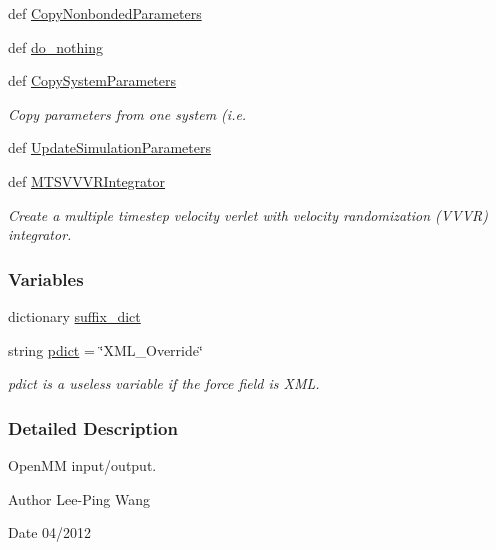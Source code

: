 \begin{DoxyCompactItemize}
\item 
def \hyperlink{namespaceforcebalance_1_1openmmio_afead47464a644d9225f9fa8eb568a8ed}{Copy\-Nonbonded\-Parameters}
\item 
def \hyperlink{namespaceforcebalance_1_1openmmio_a2bb7add6b813d94f2655372c51fe8fdc}{do\-\_\-nothing}
\item 
def \hyperlink{namespaceforcebalance_1_1openmmio_a8c6ed589ec2b35b8363a529ffdf88eb0}{Copy\-System\-Parameters}
\begin{DoxyCompactList}\small\item\em Copy parameters from one system (i.\-e. \end{DoxyCompactList}\item 
def \hyperlink{namespaceforcebalance_1_1openmmio_a9f9fc56475dbfcc94a40fef6a84ed25f}{Update\-Simulation\-Parameters}
\item 
def \hyperlink{namespaceforcebalance_1_1openmmio_aa085594c11e9cd00ce71f5a8ead72b68}{M\-T\-S\-V\-V\-V\-R\-Integrator}
\begin{DoxyCompactList}\small\item\em Create a multiple timestep velocity verlet with velocity randomization (V\-V\-V\-R) integrator. \end{DoxyCompactList}\end{DoxyCompactItemize}
\subsubsection*{Variables}
\begin{DoxyCompactItemize}
\item 
dictionary \hyperlink{namespaceforcebalance_1_1openmmio_aeca37c08912f1a88339680ed75839530}{suffix\-\_\-dict}
\item 
string \hyperlink{namespaceforcebalance_1_1openmmio_af225f2cfdcfd96ebd1d3175c8770a850}{pdict} = \char`\"{}X\-M\-L\-\_\-\-Override\char`\"{}
\begin{DoxyCompactList}\small\item\em pdict is a useless variable if the force field is X\-M\-L. \end{DoxyCompactList}\end{DoxyCompactItemize}


\subsubsection{Detailed Description}
Open\-M\-M input/output. \begin{DoxyAuthor}{Author}
Lee-\/\-Ping Wang 
\end{DoxyAuthor}
\begin{DoxyDate}{Date}
04/2012 
\end{DoxyDate}


